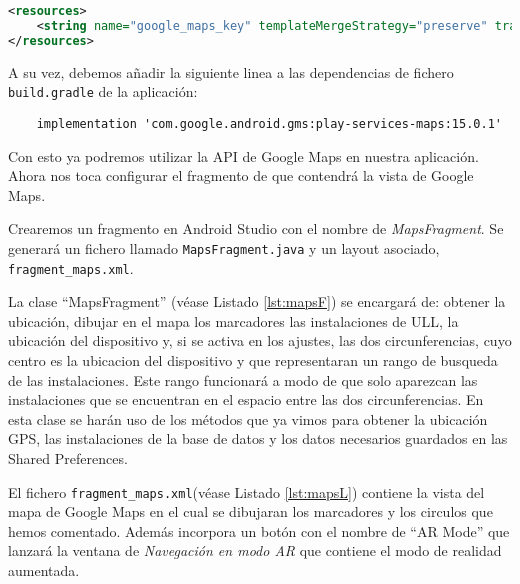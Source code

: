\begin{lstlisting}[stringstyle=\color{purple},language=XML,caption={Fichero \texttt{google\_maps\_api.xml}.},  label={lst:apiMaps}]
<resources>
    <string name="google_maps_key" templateMergeStrategy="preserve" translatable="false">API_Maps</string>
</resources>
\end{lstlisting}
 
A su vez, debemos añadir la siguiente linea a las dependencias de fichero \texttt{build.gradle} de la aplicación:
 
\begin{lstlisting}
    implementation 'com.google.android.gms:play-services-maps:15.0.1'
\end{lstlisting}

Con esto ya podremos utilizar la API de Google Maps en nuestra aplicación. Ahora nos toca configurar el fragmento de que contendrá la vista de Google Maps. 

Crearemos un fragmento en Android Studio con el nombre de \textit{MapsFragment}. Se generará un fichero llamado \texttt{MapsFragment.java} y un layout asociado, \texttt{fragment\_maps.xml}.

La clase ``MapsFragment'' (véase Listado \ref{lst:mapsF}) se encargará de: obtener la ubicación, dibujar en el mapa los marcadores las instalaciones de ULL, la ubicación del dispositivo y, si se activa en los ajustes, las dos circunferencias, cuyo centro es la ubicacion del dispositivo y que representaran un rango de busqueda de las instalaciones. Este rango funcionará a modo de que solo aparezcan las instalaciones que se encuentran en el espacio entre las dos circunferencias. En esta clase se harán uso de los métodos que ya vimos para obtener la ubicación GPS, las instalaciones de la base de datos y los datos necesarios guardados en las Shared Preferences.   

\bigskip



El fichero \texttt{fragment\_maps.xml}(véase Listado \ref{lst:mapsL}) contiene la vista del mapa de Google Maps en el cual se dibujaran los marcadores y los circulos que hemos comentado. Además incorpora un botón con el nombre de ``AR Mode'' que lanzará la ventana de \textit{Navegación en modo AR} que contiene el modo de realidad aumentada.


    

